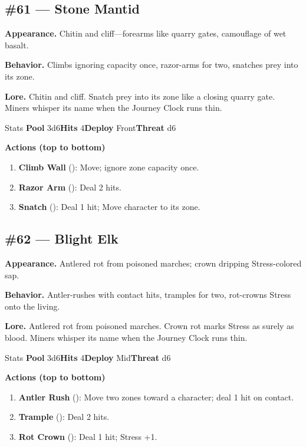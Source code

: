 \subsection*{\#61 --- Stone Mantid}

\textbf{Appearance.} Chitin and cliff---forearms like quarry gates, camouflage of wet basalt.

\textbf{Behavior.} Climbs ignoring capacity once, razor-arms for two, snatches prey into its zone.

\textbf{Lore.} Chitin and cliff. Snatch prey into its zone like a closing quarry gate. Miners whisper its name when the Journey Clock runs thin.

\begin{monsterentry}{Stats}
\textbf{Pool} 3d6\quad\textbf{Hits} 4\quad\textbf{Deploy} Front\quad\textbf{Threat} d6

\textbf{Actions (top to bottom)}
\begin{enumerate}\setlength{\itemsep}{0.15em}\setlength{\parskip}{0pt}
  \item \textbf{Climb Wall} (\easy): Move; ignore zone capacity once.
  \item \textbf{Razor Arm} (\medium): Deal 2 hits.
  \item \textbf{Snatch} (\hard): Deal 1 hit; Move character to its zone.
\end{enumerate}
\end{monsterentry}

\subsection*{\#62 --- Blight Elk}

\textbf{Appearance.} Antlered rot from poisoned marches; crown dripping Stress-colored sap.

\textbf{Behavior.} Antler-rushes with contact hits, tramples for two, rot-crowns Stress onto the living.

\textbf{Lore.} Antlered rot from poisoned marches. Crown rot marks Stress as surely as blood. Miners whisper its name when the Journey Clock runs thin.

\begin{monsterentry}{Stats}
\textbf{Pool} 3d6\quad\textbf{Hits} 4\quad\textbf{Deploy} Mid\quad\textbf{Threat} d6

\textbf{Actions (top to bottom)}
\begin{enumerate}\setlength{\itemsep}{0.15em}\setlength{\parskip}{0pt}
  \item \textbf{Antler Rush} (\easy): Move two zones toward a character; deal 1 hit on contact.
  \item \textbf{Trample} (\medium): Deal 2 hits.
  \item \textbf{Rot Crown} (\hard): Deal 1 hit; Stress +1.
\end{enumerate}
\end{monsterentry}

